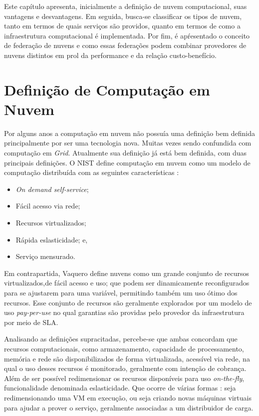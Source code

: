 Este capítulo apresenta, inicialmente a definição de nuvem computacional, suas vantagens e desvantagens. Em seguida, busca-se classificar os tipos de nuvem, tanto em termos de quais serviços são providos, quanto em termos de como a infraestrutura computacional é implementada. Por fim, é apŕesentado o conceito de federação de nuvens e como essas federações podem combinar provedores de nuvens distintos em prol da performance e da relação custo-benefício.

\section{Definição de Computação em Nuvem}

Por alguns anos a computação em nuvem não possuía uma definição bem definida principalmente por ser uma tecnologia nova. Muitas vezes sendo confundida com computação em \textit{Grid}. Atualmente sua definição já está bem definida, com duas principais definições. O \acrfull{NIST} define computação em nuvem como um modelo de computação distribuída com as seguintes características \cite{NIST_CLOUD_DEFINITION}: 
\begin{itemize}
	\item \textit{On demand self-service};
	\item Fácil acesso via rede;
	\item Recursos virtualizados;
	\item Rápida eslasticidade; e,
	\item Serviço mensurado.
\end{itemize}

Em contrapartida, Vaquero\cite{Vaquero:2008:BCT:1496091.1496100_Cloud_definition} define nuvens como um grande conjunto de recursos virtualizados,\iffalse tais como \textit{hardware},plataforma de desenvolvimentos e/ou serviços \fi de fácil acesso e uso; que podem ser dinamicamente reconfigurados para se ajustarem para uma variável, permitindo também um uso ótimo dos recursos. Esse conjunto de recursos são geralmente explorados por um modelo de uso \textit{pay-per-use} no qual garantias são providas pelo provedor da infraestrutura por meio de \acrfull{SLA}.

Analisando as definições supracitadas, percebe-se que ambas concordam que recursos computacionais, como armazenamento, capacidade de processamento, memória e rede são disponibilizados de forma virtualizada, acessível via rede, na qual o uso desses recursos é monitorado, geralmente com intenção de cobrança. Além de ser possível redimensionar os recursos disponíveis para uso \textit{on-the-fly}, funcionalidade denominada eslasticidade. Que ocorre de várias formas \cite{Coutinho2015}: seja redimensionando uma \acrshort{VM} em execução, ou seja criando novas máquinas virtuais para ajudar a prover o serviço, geralmente associadas a um distribuidor de carga.


